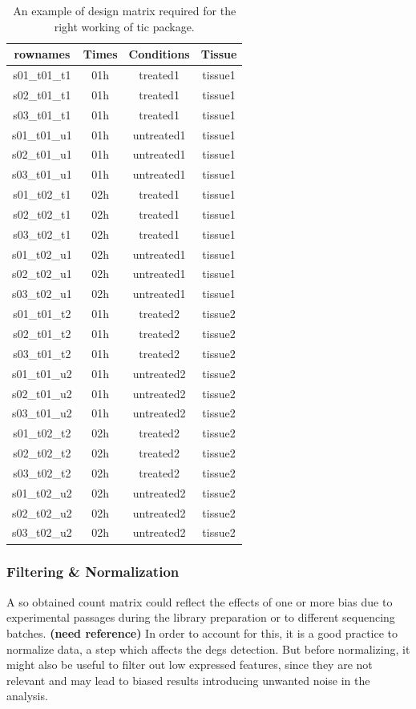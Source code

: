 \begin{table}[H]
\centering
\begin{tabular}{cccc}
\hline\hline
rownames & Times & Conditions & Tissue \\
\hline
s01\_t01\_t1 & 01h & treated1 & tissue1 \\
s02\_t01\_t1 & 01h & treated1 & tissue1 \\
s03\_t01\_t1 & 01h & treated1 & tissue1 \\
s01\_t01\_u1 & 01h & untreated1 & tissue1 \\
s02\_t01\_u1 & 01h & untreated1 & tissue1 \\
s03\_t01\_u1 & 01h & untreated1 & tissue1 \\
s01\_t02\_t1 & 02h & treated1 & tissue1 \\
s02\_t02\_t1 & 02h & treated1 & tissue1 \\
s03\_t02\_t1 & 02h & treated1 & tissue1 \\
s01\_t02\_u1 & 02h & untreated1 & tissue1 \\
s02\_t02\_u1 & 02h & untreated1 & tissue1 \\
s03\_t02\_u1 & 02h & untreated1 & tissue1 \\
s01\_t01\_t2 & 01h & treated2 & tissue2 \\
s02\_t01\_t2 & 01h & treated2 & tissue2 \\
s03\_t01\_t2 & 01h & treated2 & tissue2 \\
s01\_t01\_u2 & 01h & untreated2 & tissue2 \\
s02\_t01\_u2 & 01h & untreated2 & tissue2 \\
s03\_t01\_u2 & 01h & untreated2 & tissue2 \\
s01\_t02\_t2 & 02h & treated2 & tissue2 \\
s02\_t02\_t2 & 02h & treated2 & tissue2 \\
s03\_t02\_t2 & 02h & treated2 & tissue2 \\
s01\_t02\_u2 & 02h & untreated2 & tissue2 \\
s02\_t02\_u2 & 02h & untreated2 & tissue2 \\
s03\_t02\_u2 & 02h & untreated2 & tissue2 \\
\hline
\end{tabular}
\caption[\gls{tic} Design Matrix example]{An example of design matrix required for the right working of \gls{tic} package.}
\label{tab:ticorserdesmat}
\end{table}

\subsubsection{Filtering \& Normalization}
A so obtained count matrix could reflect the effects of one or more bias due to experimental passages during the library preparation or to different sequencing batches. \textbf{(need reference)}
In order to account for this, it is a good practice to normalize data, a step which affects the \glspl{deg} detection\cite{Peixoto2015, Soneson2013d, Bullard2010}.
But before normalizing, it might also be useful to filter out low expressed features, since they are not relevant and may lead to biased results introducing unwanted noise in the analysis. 

